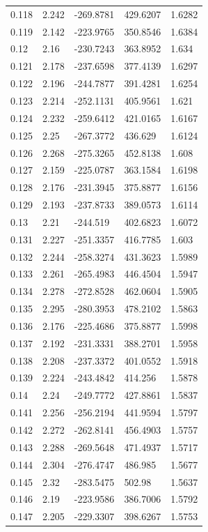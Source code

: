 \begin{tabular}{lllll}
0.118 & 2.242 & -269.8781 & 429.6207 & 1.6282 \\
0.119 & 2.142 & -223.9765 & 350.8546 & 1.6384 \\
0.12 & 2.16 & -230.7243 & 363.8952 & 1.634 \\
0.121 & 2.178 & -237.6598 & 377.4139 & 1.6297 \\
0.122 & 2.196 & -244.7877 & 391.4281 & 1.6254 \\
0.123 & 2.214 & -252.1131 & 405.9561 & 1.621 \\
0.124 & 2.232 & -259.6412 & 421.0165 & 1.6167 \\
0.125 & 2.25 & -267.3772 & 436.629 & 1.6124 \\
0.126 & 2.268 & -275.3265 & 452.8138 & 1.608 \\
0.127 & 2.159 & -225.0787 & 363.1584 & 1.6198 \\
0.128 & 2.176 & -231.3945 & 375.8877 & 1.6156 \\
0.129 & 2.193 & -237.8733 & 389.0573 & 1.6114 \\
0.13 & 2.21 & -244.519 & 402.6823 & 1.6072 \\
0.131 & 2.227 & -251.3357 & 416.7785 & 1.603 \\
0.132 & 2.244 & -258.3274 & 431.3623 & 1.5989 \\
0.133 & 2.261 & -265.4983 & 446.4504 & 1.5947 \\
0.134 & 2.278 & -272.8528 & 462.0604 & 1.5905 \\
0.135 & 2.295 & -280.3953 & 478.2102 & 1.5863 \\
0.136 & 2.176 & -225.4686 & 375.8877 & 1.5998 \\
0.137 & 2.192 & -231.3331 & 388.2701 & 1.5958 \\
0.138 & 2.208 & -237.3372 & 401.0552 & 1.5918 \\
0.139 & 2.224 & -243.4842 & 414.256 & 1.5878 \\
0.14 & 2.24 & -249.7772 & 427.8861 & 1.5837 \\
0.141 & 2.256 & -256.2194 & 441.9594 & 1.5797 \\
0.142 & 2.272 & -262.8141 & 456.4903 & 1.5757 \\
0.143 & 2.288 & -269.5648 & 471.4937 & 1.5717 \\
0.144 & 2.304 & -276.4747 & 486.985 & 1.5677 \\
0.145 & 2.32 & -283.5475 & 502.98 & 1.5637 \\
0.146 & 2.19 & -223.9586 & 386.7006 & 1.5792 \\
0.147 & 2.205 & -229.3307 & 398.6267 & 1.5753 \\

\end{tabular}
